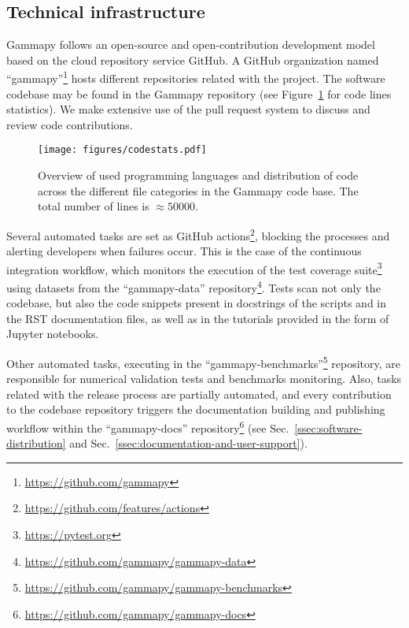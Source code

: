 \documentclass[longauth]{aa}
\newcommand{\gammapy}{Gammapy\xspace}
\newcommand{\github}{GitHub\xspace}
\begin{document}
\subsection{Technical infrastructure}
\label{ssec:technical-infrastructure}

\gammapy follows an open-source and open-contribution development model based on
the cloud repository service \github. A \github organization named
\enquote{gammapy}\footnote{\url{https://github.com/gammapy}} hosts different
repositories related with the project. The software codebase may be found in
the Gammapy repository (see
Figure~\ref{fig:codestats:lang} for code lines statistics). We make extensive
use of the pull request system to discuss and review code contributions.

\begin{figure}[t]
        \centering
        \texttt{[image: figures/codestats.pdf]}
        \caption{
                Overview of used programming languages and distribution of code across the different file
        categories in the \gammapy code base. The total number of lines is $\approx 50 000$.
    }
        \label{fig:codestats:lang}
\end{figure}

Several automated tasks are set as \github
actions\footnote{\url{https://github.com/features/actions}}, blocking the
processes and alerting developers when failures occur. This is the case of the
continuous integration workflow, which monitors the execution of the test coverage
suite\footnote{\url{https://pytest.org}} using datasets from the
\enquote{gammapy-data} repository\footnote{\url{https://github.com/gammapy/gammapy-data}}.
Tests scan not only the codebase, but also the
code snippets present in docstrings of the scripts and in the RST documentation
files, as well as in the tutorials provided in the form of Jupyter notebooks.

Other automated tasks, executing in the
\enquote{gammapy-benchmarks}\footnote{\url{https://github.com/gammapy/gammapy-benchmarks}} repository,
are responsible for numerical validation tests and benchmarks monitoring. Also,
tasks related with the release process are partially automated, and every
contribution to the codebase repository triggers the documentation building and
publishing workflow within the
\enquote{gammapy-docs} repository\footnote{\url{https://github.com/gammapy/gammapy-docs}}
(see Sec.~\ref{ssec:software-distribution} and Sec.~\ref{ssec:documentation-and-user-support}).
\end{document}
